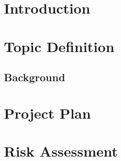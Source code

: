 \documentclass[a4paper]{article}
\begin{document}
\section{Introduction}

\section{Topic Definition}
\subsection{Background}

\section{Project Plan}
\section{Risk Assessment}
\end{document}
